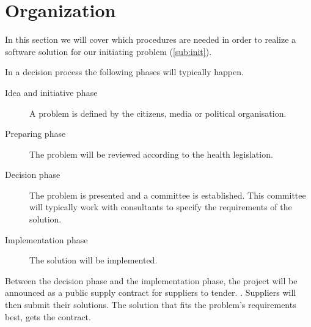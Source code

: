 \section{Organization} %
\label{sec:organization}

In this section we will cover which procedures are needed in order to realize a software solution for our initiating problem (\cref{sub:init}).

In a decision process the following phases will typically happen. \cite{Sjaelland}

\begin{description}
	\item[Idea and initiative phase] A problem is defined by the citizens, media or political organisation.
	\item[Preparing phase] The problem will be reviewed according to the health legislation.
	\item[Decision phase] The problem is presented and a committee is established. This committee will typically work with consultants to specify the requirements of the solution.
	\item[Implementation phase] The solution will be implemented. 


\end{description}


Between the decision phase and the implementation phase, the project will be announced as a public supply contract for suppliers to tender. \cite{Union2004}. Suppliers will then submit their solutions. The solution that fits the problem's requirements best, gets the contract. 


